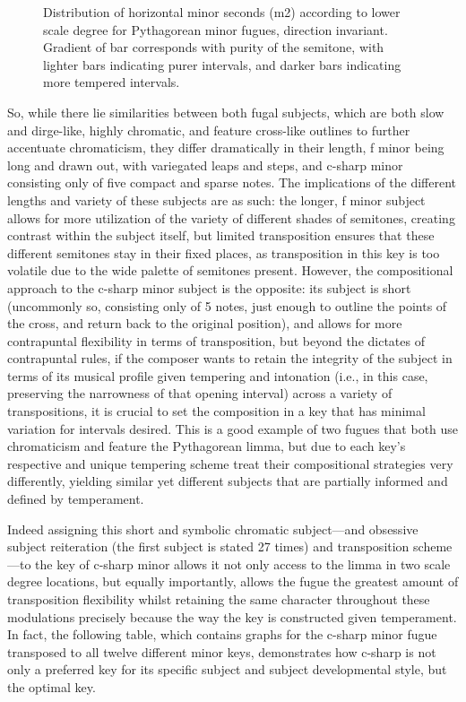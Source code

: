 \begin{figure}[H]
\vspace{1.5em}
    \centering
    \caption[Distribution of horizontal minor seconds (m2), according to lower scale degree for Pythagorean minor fugues, direction invariant. ]{Distribution of horizontal minor seconds (m2) according to lower scale degree for Pythagorean minor fugues, direction invariant. Gradient of bar corresponds with purity of the semitone, with lighter bars indicating purer intervals, and darker bars indicating more tempered intervals.}
\end{figure}    So, while there lie similarities between both fugal subjects, which are
both slow and dirge-like, highly chromatic, and feature cross-like
outlines to further accentuate chromaticism, they differ dramatically in
their length, f minor being long and drawn out, with variegated leaps
and steps, and c-sharp minor consisting only of five compact and sparse
notes. The implications of the different lengths and variety of these
subjects are as such: the longer, f minor subject allows for more
utilization of the variety of different shades of semitones, creating
contrast within the subject itself, but limited transposition ensures
that these different semitones stay in their fixed places, as
transposition in this key is too volatile due to the wide palette of
semitones present. However, the compositional approach to the c-sharp
minor subject is the opposite: its subject is short (uncommonly so,
consisting only of 5 notes, just enough to outline the points of the
cross, and return back to the original position), and allows for more
contrapuntal flexibility in terms of transposition, but beyond the
dictates of contrapuntal rules, if the composer wants to retain the
integrity of the subject in terms of its musical profile given tempering
and intonation (i.e., in this case, preserving the narrowness of that
opening interval) across a variety of transpositions, it is crucial to
set the composition in a key that has minimal variation for intervals
desired. This is a good example of two fugues that both use chromaticism
and feature the Pythagorean limma, but due to each key's respective and
unique tempering scheme treat their compositional strategies very
differently, yielding similar yet different subjects that are partially
informed and defined by temperament.

Indeed assigning this short and symbolic chromatic subject---and
obsessive subject reiteration (the first subject is stated 27 times) and
transposition scheme---to the key of c-sharp minor allows it not
only access to the limma in two scale degree locations, but equally
importantly, allows the fugue the greatest amount of transposition
flexibility whilst retaining the same character throughout these
modulations precisely because the way the key is constructed given
temperament. In fact, the following table, which contains graphs for the
c-sharp minor fugue transposed to all twelve different minor keys,
demonstrates how c-sharp is not only a preferred key for its specific
subject and subject developmental style, but the optimal key.



